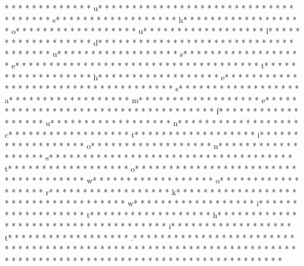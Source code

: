 *  * * *  *  * * *  *  * * *  * u* * *  * * *  * * *  *  * * *  *  * * *  *  * * *  * * *  * * *  *  * * *  *  * * *  * s* * *  * * *  * * *  *  * * *  *  * * *  * h* * *  * * *  * * *  *  * * *  *  * * *  * o* * *  * * *  * * *  *  * * *  *  * * *  * u* * *  * * *  * * *  *  * * *  *  * * *  * l* * *  * * *  * * *  *  * * *  *  * * *  * d* * *  * * *  * * *  *  * * *  *  * * *  *  * * *  * * *  * * *  *  * * *  *  * * *  * u* * *  * * *  * * *  *  * * *  *  * * *  * s* * *  * * *  * * *  *  * * *  *  * * *  * e* * *  * * *  * * *  *  * * *  *  * * *  *  * * *  * * *  * * *  *  * * *  *  * * *  * t* * *  * * *  * * *  *  * * *  *  * * *  * h* * *  * * *  * * *  *  * * *  *  * * *  * e* * *  * * *  * * *  *  * * *  *  * * *  *  * * *  * * *  * * *  *  * * *  *  * * *  * s* * *  * * *  * * *  *  * * *  *  * * *  * a* * *  * * *  * * *  *  * * *  *  * * *  * m* * *  * * *  * * *  *  * * *  *  * * *  * e* * *  * * *  * * *  *  * * *  *  * * *  *  * * *  * * *  * * *  *  * * *  *  * * *  * f* * *  * * *  * * *  *  * * *  *  * * *  * u* * *  * * *  * * *  *  * * *  *  * * *  * n* * *  * * *  * * *  *  * * *  *  * * *  * c* * *  * * *  * * *  *  * * *  *  * * *  * t* * *  * * *  * * *  *  * * *  *  * * *  * i* * *  * * *  * * *  *  * * *  *  * * *  * o* * *  * * *  * * *  *  * * *  *  * * *  * n* * *  * * *  * * *  *  * * *  *  * * *  * s* * *  * * *  * * *  *  * * *  *  * * *  *  * * *  * * *  * * *  *  * * *  *  * * *  * t* * *  * * *  * * *  *  * * *  *  * * *  * o* * *  * * *  * * *  *  * * *  *  * * *  *  * * *  * * *  * * *  *  * * *  *  * * *  * w* * *  * * *  * * *  *  * * *  *  * * *  * o* * *  * * *  * * *  *  * * *  *  * * *  * r* * *  * * *  * * *  *  * * *  *  * * *  * k* * *  * * *  * * *  *  * * *  *  * * *  *  * * *  * * *  * * *  *  * * *  *  * * *  * w* * *  * * *  * * *  *  * * *  *  * * *  * i* * *  * * *  * * *  *  * * *  *  * * *  * t* * *  * * *  * * *  *  * * *  *  * * *  * h* * *  * * *  * * *  *  * * *  *  * * *  *  * * *  * * *  * * *  *  * * *  *  * * *  * i* * *  * * *  * * *  *  * * *  *  * * *  * t* * *  * * *  * * *  *  * * *  *  * * *  * .* * *  * * *  * * *  *  * * *  *  * * *  *  * * *  * * *  * * *  *  * * *  *  * * *  * 
* * *  * * *  * * *  *  * * *  *  * * *  * 	* * *  * * *  * * *  *  * * *  *  * * *  * 	* * *  * * *  * * *  *  * * *  *  * * *  * 	* * *  * * *  * * *  *  * * *  *  * * *  * 
